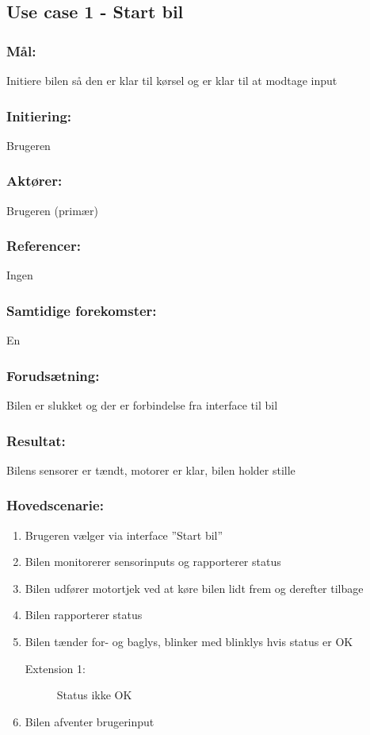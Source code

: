\begin{framed}
	\subsection{Use case 1 - Start bil}
	\subsubsection*{Mål:}
		Initiere bilen så den er klar til kørsel og er klar til at modtage input
		
	\subsubsection*{Initiering:}
		Brugeren
	
	\subsubsection*{Aktører:}
		Brugeren (primær)
	
	\subsubsection*{Referencer:}
		Ingen
	
	\subsubsection*{Samtidige forekomster:}
		En
	
	\subsubsection*{Forudsætning:}
		Bilen er slukket og der er forbindelse fra interface til bil
	
	\subsubsection*{Resultat:}
		Bilens sensorer er tændt, motorer er klar, bilen holder stille
	
	\subsubsection*{Hovedscenarie:}
		\begin{enumerate}
			\item Brugeren vælger via interface ''Start bil''
			\item Bilen monitorerer sensorinputs og rapporterer status 
			\item Bilen udfører motortjek ved at køre bilen lidt frem og derefter tilbage
			\item Bilen rapporterer status
			\item Bilen tænder for- og baglys, blinker med blinklys hvis status er OK 
			\begin{description}
					\item[Extension 1:] Status ikke OK
			\end{description}
			\item Bilen afventer brugerinput
		\end{enumerate}
	

\end{framed}
